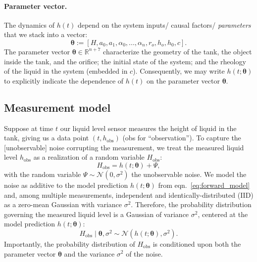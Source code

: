 \documentclass[openacc]{rsproca_new}%
\begin{document}
\paragraph{Parameter vector.} The dynamics of $h(t)$ depend on the system inputs/ causal factors/ \emph{parameters} that we stack into a vector:
\begin{equation}
	\boldsymbol \theta := [H, a_0, a_1, \alpha_0, ..., \alpha_n , r_o, h_o, h_0, c].
\end{equation}
The parameter vector $\boldsymbol \theta \in \mathbb{R}^{n+7}$ characterize the geometry of the tank, the object inside the tank, and the orifice; the initial state of the system; and the rheology of the liquid in the system (embedded in $c$). Consequently, we may write $h(t; \boldsymbol \theta)$ to explicitly indicate the dependence of $h(t)$ on the parameter vector $\boldsymbol \theta$. 

\subsection{Measurement model}
Suppose at time $t$ our liquid level sensor measures the height of liquid in the tank, giving us a data point $(t, h_{\text{obs}})$ (obs for ``observation''). 
To capture the [unobservable] noise corrupting the measurement, we treat the measured liquid level $h_{\text{obs}}$ as a realization of a random variable $H_{\text{obs}}$:
\begin{equation}
	H_{\text{obs}} = h(t; \boldsymbol \theta)  + \Psi,
\end{equation}
with the random variable $\Psi \sim \mathcal{N}(0, \sigma^2)$ the unobservable noise. 
We model the noise as additive to the model prediction $h(t; \boldsymbol \theta)$ from eqn.~\ref{eq:forward_model} and, among multiple measurements, independent and identically-distributed (IID) as a zero-mean Gaussian with variance $\sigma^2$. 
Therefore, the probability distribution governing the measured liquid level is a Gaussian of variance $\sigma^2$, centered at the model prediction $h(t;\boldsymbol \theta)$:
\begin{equation}
	H_{\text{obs}} \mid \boldsymbol  \theta, \sigma^2 \sim \mathcal{N}(h(t; \boldsymbol \theta), \sigma^2). \label{eq:H_obs_distn}
\end{equation} Importantly, the probability distribution of $H_{\text{obs}}$ is conditioned upon both the parameter vector $\boldsymbol  \theta$ and the variance $\sigma^2$ of the noise.

\end{document}
